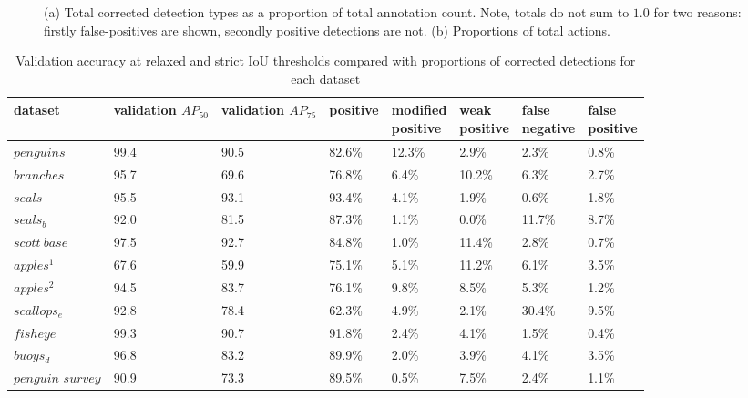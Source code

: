 \begin{figure}[ht!]
\caption {(a) Total corrected detection types as a proportion of total annotation count. Note, totals do not sum to $1.0$ for two reasons: firstly false-positives are shown, secondly positive detections are not. (b) Proportions of total actions. }
\label{fig:actions_dataset}
\end{figure}

\begin{table}[th!]
\caption{Validation accuracy at relaxed and strict IoU thresholds compared with proportions of corrected detections for each dataset}
\label{tab:validation_corrections}
\begin{adjustbox}{max width=\textwidth}
\begin{tabular}{llllllll}
dataset           & \shortstack{validation \\ $AP_{50}$} & \shortstack{validation  \\ $AP_{75}$} & positive & \shortstack{modified\\ positive} & \shortstack{weak\\ positive} & \shortstack{false \\ negative} & \shortstack{false \\ positive} \\
\toprule
$penguins$        & 99.4      & 90.5      & 82.6\%   & 12.3\%            & 2.9\%         & 2.3\%          & 0.8\%          \\
$branches$        & 95.7      & 69.6      & 76.8\%   & 6.4\%             & 10.2\%        & 6.3\%          & 2.7\%          \\
$seals$           & 95.5      & 93.1      & 93.4\%   & 4.1\%             & 1.9\%         & 0.6\%          & 1.8\%          \\
$seals_b$         & 92.0      & 81.5      & 87.3\%   & 1.1\%             & 0.0\%         & 11.7\%         & 8.7\%          \\
$scott\:base$     & 97.5      & 92.7      & 84.8\%   & 1.0\%             & 11.4\%        & 2.8\%          & 0.7\%          \\
$apples^1$        & 67.6      & 59.9      & 75.1\%   & 5.1\%             & 11.2\%        & 6.1\%          & 3.5\%          \\
$apples^2$        & 94.5      & 83.7      & 76.1\%   & 9.8\%             & 8.5\%         & 5.3\%          & 1.2\%          \\
$scallops_e$      & 92.8      & 78.4      & 62.3\%   & 4.9\%             & 2.1\%         & 30.4\%         & 9.5\%          \\
$fisheye$         & 99.3      & 90.7      & 91.8\%   & 2.4\%             & 4.1\%         & 1.5\%          & 0.4\%          \\
$buoys_d$         & 96.8      & 83.2      & 89.9\%   & 2.0\%             & 3.9\%         & 4.1\%          & 3.5\%          \\
\shortstack {$penguin$ \\ $survey$} & 90.9      & 73.3      & 89.5\%   & 0.5\%             & 7.5\%         & 2.4\%          & 1.1\%        \\ 
\bottomrule
\end{tabular}
\end{adjustbox}
\end{table}


